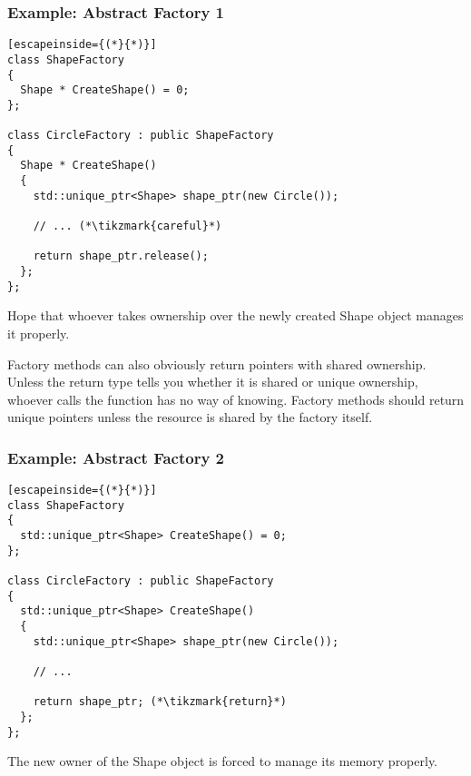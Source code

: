 \documentclass[11pt,a4paper,dvipsnames,usenames]{beamer}
\newcommand{\tikzmark}[1]{\tikz[overlay,remember picture] \node (#1) {};}
\newcommand{\object}[1]{{\ttfamily \color{OliveGreen}#1}}
\begin{document}
\begin{frame}[fragile]
  \frametitle{Example: Abstract Factory 1}
  
  \begin{lstlisting}[escapeinside={(*}{*)}]
class ShapeFactory
{
  Shape * CreateShape() = 0;
};

class CircleFactory : public ShapeFactory
{
  Shape * CreateShape()
  {
    std::unique_ptr<Shape> shape_ptr(new Circle());

    // ... (*\tikzmark{careful}*)

    return shape_ptr.release();
  };
};
  \end{lstlisting}


  Hope that whoever takes ownership over the newly created \object{Shape} object 
  manages it properly.

  \note
  {
    Factory methods can also obviously return pointers with shared ownership. Unless
    the return type tells you whether it is shared or unique ownership, whoever calls
    the function has no way of knowing. Factory methods should return unique pointers 
    unless the resource is shared by the factory itself.
  }

\end{frame}

\begin{frame}[fragile]
  \frametitle{Example: Abstract Factory 2}
  
  \begin{lstlisting}[escapeinside={(*}{*)}]
class ShapeFactory
{
  std::unique_ptr<Shape> CreateShape() = 0;
};

class CircleFactory : public ShapeFactory
{
  std::unique_ptr<Shape> CreateShape()
  {
    std::unique_ptr<Shape> shape_ptr(new Circle());

    // ...

    return shape_ptr; (*\tikzmark{return}*)
  };
};
  \end{lstlisting}



  The new owner of the \object{Shape} object is forced to manage its memory properly.

\end{frame}
\end{document}
